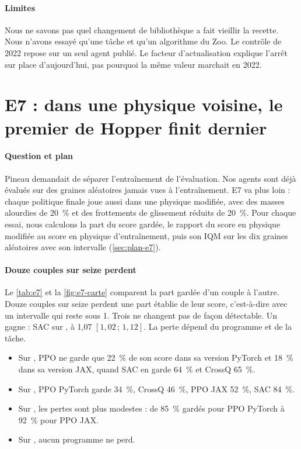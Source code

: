 \paragraph{Limites}
Nous ne savons pas quel changement de bibliothèque a fait vieillir la recette. Nous n'avons essayé qu'une
tâche et qu'un algorithme du Zoo. Le contrôle de 2022 repose sur un seul agent publié. Le facteur
d'actualisation explique l'arrêt sur place d'aujourd'hui, pas pourquoi la même valeur marchait en 2022.

\section{E7 : dans une physique voisine, le premier de Hopper finit dernier}\label{sec:e7}

\paragraph{Question et plan}
Pineau demandait de séparer l'entraînement de l'évaluation. Nos agents sont déjà évalués sur des graines
aléatoires jamais vues à l'entraînement. E7 va plus loin : chaque politique finale joue aussi dans une
physique modifiée, avec des masses alourdies de 20~\% et des frottements de glissement réduits de 20~\%. Pour
chaque essai, nous calculons la part du score gardée, le rapport du score en physique modifiée au score en
physique d'entraînement, puis son IQM sur les dix graines aléatoires avec son intervalle (\cref{sec:plan-e7}).

\paragraph{Douze couples sur seize perdent}
Le \cref{tab:e7} et la \cref{fig:e7-carte} comparent la part gardée d'un couple à l'autre. Douze couples sur seize
perdent une part établie de leur score, c'est-à-dire avec un intervalle qui reste sous 1. Trois ne changent pas
de façon détectable. Un gagne : SAC sur , à 1,07 $[1{,}02\,;\,1{,}12]$. La perte dépend du
programme et de la tâche.
\begin{itemize}
  \item Sur , PPO ne garde que 22~\% de son score dans sa version PyTorch et 18~\% dans sa
    version JAX, quand SAC en garde 64~\% et CrossQ 65~\%.
  \item Sur , PPO PyTorch garde 34~\%, CrossQ 46~\%, PPO JAX 52~\%, SAC 84~\%.
  \item Sur , les pertes sont plus modestes : de 85~\% gardés pour PPO PyTorch à 92~\% pour
    PPO JAX.
  \item Sur , aucun programme ne perd.
\end{itemize}


